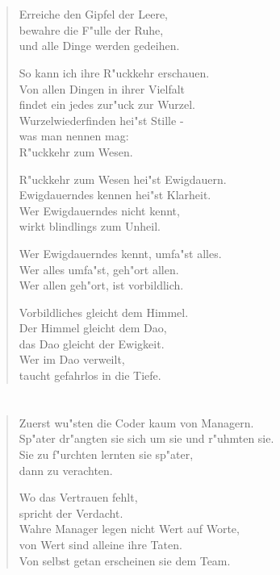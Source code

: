 \documentclass[a4paper,10pt,openany]{book}
\begin{document}
\chapter{}
\begin{verse}
    Erreiche den Gipfel der Leere,\\
    bewahre die F"ulle der Ruhe,\\
    und alle Dinge werden gedeihen.

    So kann ich ihre R"uckkehr erschauen.\\
    Von allen Dingen in ihrer Vielfalt\\
    findet ein jedes zur"uck zur Wurzel.\\
    Wurzelwiederfinden hei"st Stille -\\
    was man nennen mag:\\
    R"uckkehr zum Wesen.

    R"uckkehr zum Wesen hei"st Ewigdauern.\\
    Ewigdauerndes kennen hei"st Klarheit.\\
    Wer Ewigdauerndes nicht kennt,\\
    wirkt blindlings zum Unheil.

    Wer Ewigdauerndes kennt, umfa"st alles.\\
    Wer alles umfa"st, geh"ort allen.\\
    Wer allen geh"ort, ist vorbildlich.

    Vorbildliches gleicht dem Himmel.\\
    Der Himmel gleicht dem Dao,\\
    das Dao gleicht der Ewigkeit.\\
    Wer im Dao verweilt,\\
    taucht gefahrlos in die Tiefe.
\end{verse}

\chapter{}
\begin{verse}
    Zuerst wu"sten die Coder kaum von Managern.\\
    Sp"ater dr"angten sie sich um sie und r"uhmten sie.\\
    Sie zu f"urchten lernten sie sp"ater,\\
    dann zu verachten.

    Wo das Vertrauen fehlt,\\
    spricht der Verdacht.\\
    Wahre Manager legen nicht Wert auf Worte,\\
    von Wert sind alleine ihre Taten.\\
    Von selbst getan erscheinen sie dem Team.
\end{verse}
\end{document}
